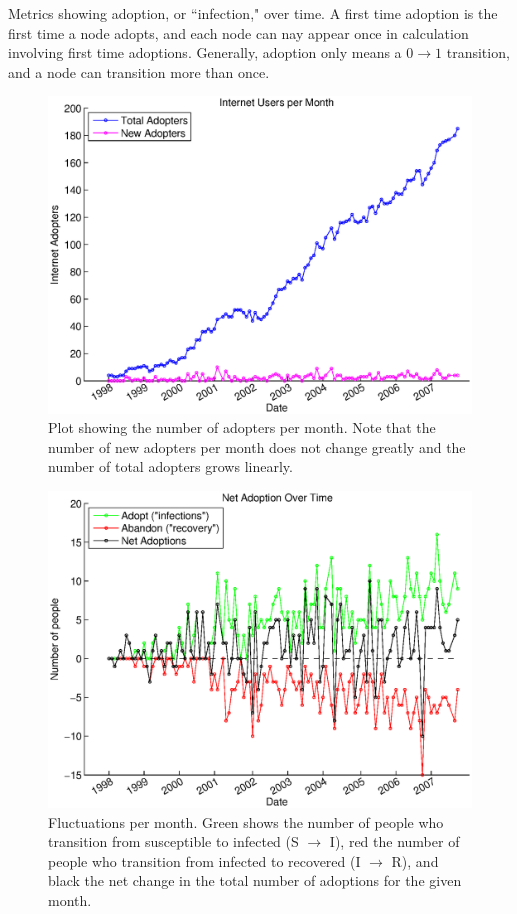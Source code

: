 \documentclass[12pt]{article}
\begin{document}
Metrics showing adoption, or ``infection," over time. A first time adoption is the first time a node adopts, and each node can nay appear once in calculation involving first time adoptions. Generally, adoption only means a \(0 \rightarrow 1\) transition, and a node can transition more than once.

\begin{figure}[H]
\centering
\includegraphics[width = .7\textwidth]{Graficos/AdoptersperMonth.eps}
\caption{Plot showing the number of adopters per month. Note that the number of new adopters per month does not change greatly and the number of total adopters grows linearly.}
\label{fig:AdoptersperMonth}
\end{figure}

\begin{figure}[H]
\centering
\includegraphics[width = .7\textwidth]{Graficos/trans.eps}
\caption{Fluctuations per month. Green shows the number of people who transition from susceptible to infected (S \(\rightarrow\) I), red the number of people who transition from infected to recovered (I \(\rightarrow\) R), and black the net change in the total number of adoptions for the given month.}
\label{fig:trans}
\end{figure}
\end{document}

